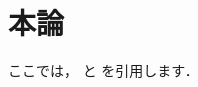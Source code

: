 \documentclass[./main]{subfiles}
\begin{document}
\section{本論}
ここでは，\citet{Mitchell1191} 
と \citet{Haxby2425} を引用します．

\end{document}
